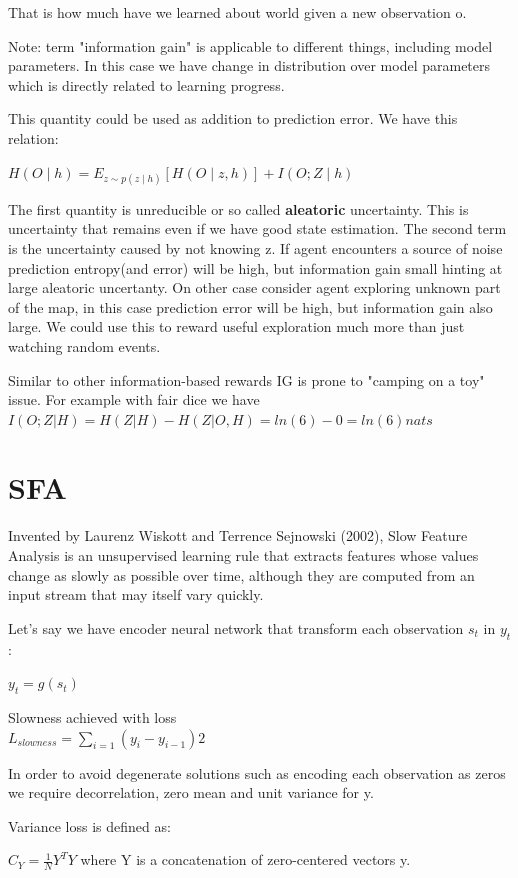That is how much have we learned about world given a new observation o.

Note: term "information gain" is applicable to different things, including model parameters. In this case we have change in distribution over model parameters which is directly related to learning progress.

This quantity could be used as addition to prediction error. We have this relation:

$ H(O \mid h) = E_{z \sim p(z \mid h)}[H(O \mid z,h)] + I(O;Z \mid h)$

The first quantity is unreducible or so called \textbf{aleatoric} uncertainty. This is uncertainty that remains even if we have good state estimation. The second term is the uncertainty caused by not knowing z. If agent encounters a source of noise prediction entropy(and error) will be high, but information gain small hinting at large aleatoric uncertanty. On other case consider agent exploring unknown part of the map, in this case prediction error will be high, but information gain also large. We could use this to reward useful exploration much more than just watching random events.

Similar to other information-based rewards IG is prone to "camping on a toy" issue. For example with fair dice we have $I(O;Z|H) = H(Z|H) - H(Z|O,H) = ln(6) - 0 = ln(6) nats$


\section{SFA}\label{sfa}

Invented by Laurenz Wiskott and Terrence Sejnowski (2002), Slow Feature Analysis is an unsupervised learning rule that extracts features whose values change as slowly as possible over time, although they are computed from an input stream that may itself vary quickly.

Let's say we have encoder neural network that transform each observation $s_{t}$ in $y_{t}$:

$y_{t} = g(s_{t})$

Slowness achieved with loss\\
$L_{slowness} = \sum_{i = 1}^{}(y_{i} - y_{i - 1})2$

In order to avoid degenerate solutions such as encoding each observation as zeros we require decorrelation, zero mean and unit variance for y.

Variance loss is defined as:

$C_{Y} = \frac{1}{N} Y^{T}Y$ where Y is a concatenation of zero-centered vectors y.


